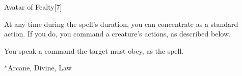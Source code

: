 \begin{spellsection}{Avatar of Fealty}[7]
    \begin{spellheader}
    \end{spellheader}
    \begin{spellcontent}
        \begin{spelltargetinginfo}
        \end{spelltargetinginfo}
        \begin{spelleffects}
            \spelleffect At any time during the spell's duration, you can concentrate as a standard action. If you do, you command a creature's actions, as described below.
            \spelldur \durlong
        \end{spelleffects}
    \end{spellcontent}
    \begin{spellsubcontent}
        \begin{spelltargetinginfo}
        \end{spelltargetinginfo}
        \begin{spelleffects}
            \spellspecial You speak a command the target must obey, as the  spell.
        \end{spelleffects}
    \end{spellsubcontent}
    \begin{spellfooter}
        *{Arcane, Divine, Law}
        \miscastexplode
    \end{spellfooter}
\end{spellsection}

